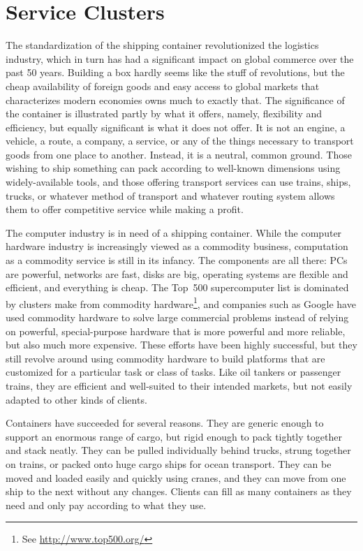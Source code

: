 \chapter{Service Clusters}

The standardization of the shipping container revolutionized the logistics industry, which in turn has had a significant impact on global commerce over the past 50 years. Building a box hardly seems like the stuff of revolutions, but the cheap availability of foreign goods and easy access to global markets that characterizes modern economies owns much to exactly that. The significance of the container is illustrated partly by what it offers, namely, flexibility and efficiency, but equally significant is what it does not offer. It is not an engine, a vehicle, a route, a company, a service, or any of the things necessary to transport goods from one place to another. Instead, it is a neutral, common ground. Those wishing to ship something can pack according to well-known dimensions using widely-available tools, and those offering transport services can use trains, ships, trucks, or whatever method of transport and whatever routing system allows them to offer competitive service while making a profit.

The computer industry is in need of a shipping container. While the computer hardware industry is increasingly viewed as a commodity business, computation as a commodity service is still in its infancy. The components are all there: PCs are powerful, networks are fast, disks are big, operating systems are flexible and efficient, and everything is cheap. The Top~500 supercomputer list is dominated by clusters make from commodity hardware\footnote{See \url{http://www.top500.org/}}, and companies such as Google have used commodity hardware to solve large commercial problems instead of relying on powerful, special-purpose hardware that is more powerful and more reliable, but also much more expensive. These efforts have been highly successful, but they still revolve around using commodity hardware to build platforms that are customized for a particular task or class of tasks. Like oil tankers or passenger trains, they are efficient and well-suited to their intended markets, but not easily adapted to other kinds of clients.

Containers have succeeded for several reasons. They are generic enough to support an enormous range of cargo, but rigid enough to pack tightly together and stack neatly. They can be pulled individually behind trucks, strung together on trains, or packed onto huge cargo ships for ocean transport. They can be moved and loaded easily and quickly using cranes, and they can move from one ship to the next without any changes. Clients can fill as many containers as they need and only pay according to what they use.

